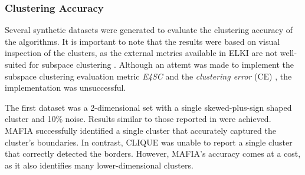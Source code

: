 \subsubsection{Clustering Accuracy}
Several synthetic datasets were generated to evaluate the clustering accuracy of the algorithms. It is important to note that the results were based on visual inspection of the clusters, as the external metrics available in ELKI are not well-suited for subspace clustering \cite{e4sc}. Although an attemt was made to implement the subspace clustering evaluation metric \textit{E4SC} and the \textit{clustering error} (CE) \cite{e4sc}, the implementation was unsuccessful.

The first dataset was a 2-dimensional set with a single skewed-plus-sign shaped cluster and 10\% noise. Results similar to those reported in \cite{mafia} were achieved. MAFIA successfully identified a single cluster that accurately captured the cluster's boundaries. In contrast, CLIQUE was unable to report a single cluster that correctly detected the borders. However, MAFIA's accuracy comes at a cost, as it also identifies many lower-dimensional clusters.



